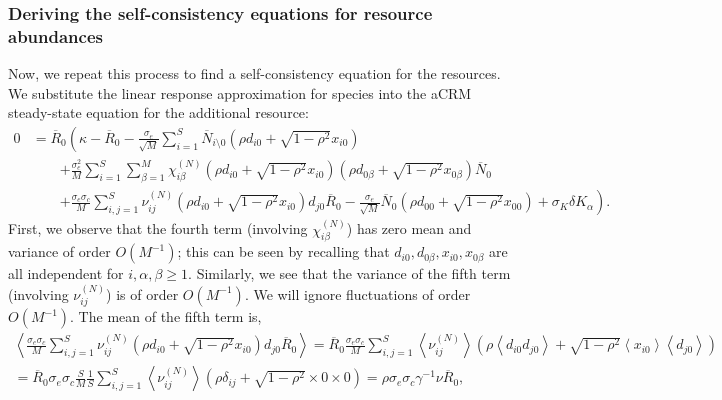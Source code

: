 \documentclass[10pt]{article}
\newcommand{\eval}[1]{\left\langle #1 \right\rangle}
\begin{document}
\subsubsection{Deriving the self-consistency equations for resource abundances}


Now, we repeat this process to find a self-consistency equation for the resources.
We substitute the linear response approximation for species into the aCRM steady-state equation for the additional resource:
\begin{align}
	0
	&=
	\overline R_0
	\left(
		\kappa
		-
		\overline R_0
		-
		\frac{\sigma_e}{\sqrt{M}}
		\sum_{i=1}^{S}
		\overline N_{i\setminus 0}
		\left(
			\rho d_{i0}
			+
			\sqrt{1-\rho^2}x_{i0}
		\right)
	\right.
	\nonumber
	\\
	&\qquad
	\left.
		+
		\frac{\sigma_e^2}{M}
		\sum_{i=1}^{S}
		\sum_{\beta = 1}^M
		\chi_{i\beta}^{(N)}
		\left(
			\rho d_{i0}
			+
			\sqrt{1-\rho^2}x_{i0}
		\right)
		\left(
			\rho d_{0\beta} + \sqrt{1-\rho^2} x_{0\beta}
		\right)\overline N_0
	\right.
	\nonumber
		\\
		&\qquad
	\left.
		+
		\frac{\sigma_e\sigma_c}{M}
		\sum_{i,j=1}^{S}
		\nu_{i j}^{(N)}
		\left(
			\rho d_{i0}
			+
			\sqrt{1-\rho^2}x_{i0}
		\right)
		d_{j0}
		\overline R_0
		-
		\frac{\sigma_e}{\sqrt{M}}
		\overline N_0
		\left(
			\rho d_{00}
			+
			\sqrt{1-\rho^2}x_{00}
		\right)
		+
		\sigma_K
		\delta K_\alpha
	\right).
	\label{substituteSusceptR0}
\end{align}
First, we observe that the fourth term (involving $\chi_{i\beta}^{(N)}$) has zero mean and variance of order $O(M^{-1})$; this can be seen by recalling that $d_{i0},d_{0\beta}, x_{i0},x_{0\beta}$ are all independent for $i,\alpha,\beta \geq 1$.
Similarly, we see that the variance of the fifth term (involving $\nu_{ij}^{(N)}$) is of order $O(M^{-1})$.
We will ignore fluctuations of order $O(M^{-1})$.
The mean of the fifth term is,
\begin{gather}
	\eval{
		\frac{\sigma_e \sigma_c}{M}
		\sum_{i,j = 1}^S
		\nu_{ij}^{(N)}
		\left(
			\rho d_{i0} + \sqrt{1-\rho^2} x_{i0}
		\right)
		d_{j0} \overline R_0
	}
	=
	\overline R_0
	\frac{\sigma_e \sigma_c}{M}
	\sum_{i,j = 1}^S
	\eval{
		\nu_{ij}^{(N)}
	}
	\left(
		\rho 
		\eval{d_{i0} 
		d_{j0} }
		+ 
		\sqrt{1-\rho^2} 
		\eval{x_{i0}}
		\eval{d_{j0} }
	\right)
	\nonumber
	\\
	=
	\overline R_0
	\sigma_e \sigma_c
	\frac{S}{M}\frac{1}{S}
	\sum_{i,j = 1}^S
	\eval{
		\nu_{ij}^{(N)}
	}
	\left(
		\rho 
		\delta_{ij}
		+ 
		\sqrt{1-\rho^2} 
		\times 0 \times 0
	\right)
	=
	\rho \sigma_e\sigma_c \gamma^{-1}\nu\overline R_0,
\end{gather}
\end{document}
